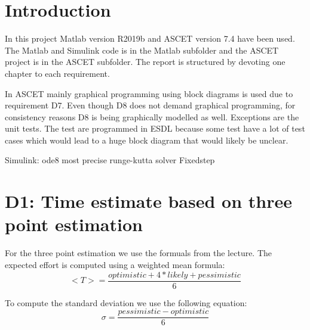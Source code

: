 
\chapter{Introduction}\label{cha:Introduction}
In this project Matlab version R2019b and ASCET version 7.4 have been used.
The Matlab and Simulink code is in the Matlab subfolder and the ASCET project is in the ASCET subfolder.
The report is structured by devoting one chapter to each requirement.

In ASCET mainly graphical programming using block diagrams is used due to requirement D7. Even though D8 does not demand graphical programming, for consistency reasons D8 is being graphically modelled as well. Exceptions are the unit tests. The test are programmed in ESDL because some test have a lot of test cases which would lead to a huge block diagram that would likely be unclear. 

Simulink: ode8 most precise runge-kutta solver
Fixedstep




\chapter{D1: Time estimate based on three point estimation}\label{cha:D1}
For the three point estimation we use the formuals from the lecture.
The expected effort is computed using a weighted mean formula:
\begin{equation}
	<T> = \frac{optimistic + 4*likely + pessimistic}{6}
\end{equation}

To compute the standard deviation we use the following equation:
\begin{equation}
	\sigma = \frac{pessimistic-optimistic}{6}
\end{equation}

